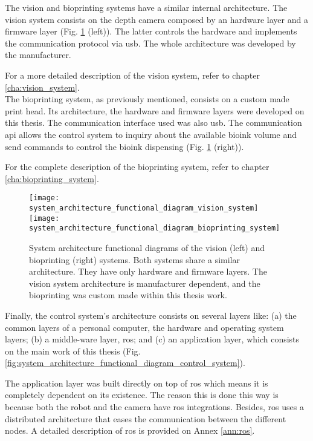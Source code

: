The vision and bioprinting systems have a similar internal architecture. The vision system consists on the depth camera composed by an hardware layer and a firmware layer (Fig. \ref{fig:system_architecture_functional_diagram_vision_bioprinting_system} (left)). The latter controls the hardware and implements the communication protocol via \gls{usb}. The whole architecture was developed by the manufacturer.

For a more detailed description of the vision system, refer to chapter \ref{cha:vision_system}.\\

The bioprinting system, as previously mentioned, consists on a custom made print head. Its architecture, the hardware and firmware layers were developed on this thesis. The communication interface used was also \gls{usb}. The communication \gls{api} allows the control system to inquiry about the available bioink volume and send commands to control the bioink dispensing (Fig. \ref{fig:system_architecture_functional_diagram_vision_bioprinting_system} (right)).

For the complete description of the bioprinting system, refer to chapter \ref{cha:bioprinting_system}.

\begin{figure}[htbp]
	\centering
	\texttt{[image: system\_architecture\_functional\_diagram\_vision\_system]}
	\hspace{0.1in}
	\texttt{[image: system\_architecture\_functional\_diagram\_bioprinting\_system]}
	\caption{System architecture functional diagrams of the vision (left) and bioprinting (right) systems. Both systems share a similar architecture. They have only hardware and firmware layers. The vision system architecture is manufacturer dependent, and the bioprinting was custom made within this thesis work.}
	\label{fig:system_architecture_functional_diagram_vision_bioprinting_system}
\end{figure}

Finally, the control system's architecture consists on several layers like: (a) the common layers of a personal computer, the hardware and operating system layers; (b) a middle-ware layer, \gls{ros}; and (c) an application layer, which consists on the main work of this thesis (Fig. \ref{fig:system_architecture_functional_diagram_control_system}).

The application layer was built directly on top of \gls{ros} which means it is completely dependent on its existence. The reason this is done this way is because both the robot and the camera have \gls{ros} integrations. Besides, \gls{ros} uses a distributed architecture that eases the communication between the different nodes. A detailed description of \gls{ros} is provided on Annex \ref{ann:ros}.

